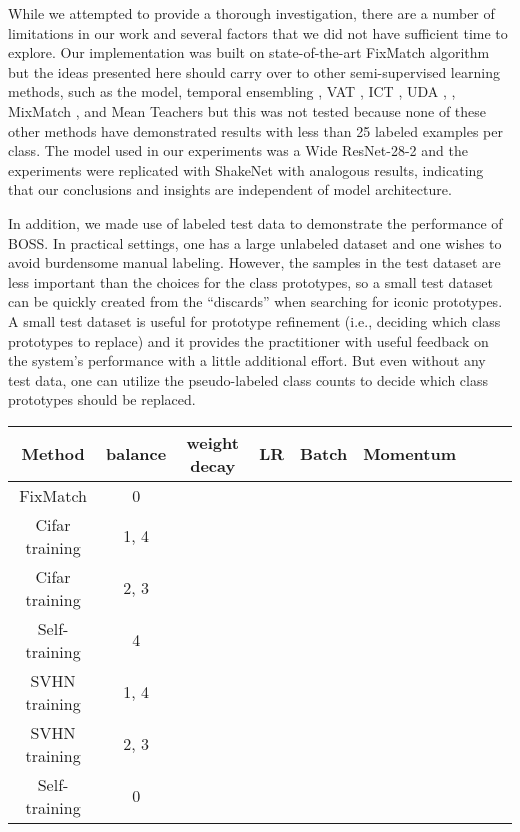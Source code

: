 \documentclass[final]{cvpr}
\newcommand{\SOTA}{state-of-the-art }
\newcommand{\SSL}{semi-supervised learning }
\begin{document}
While we attempted to provide a thorough investigation, there are a number of limitations in our work and several factors that we did not have sufficient time to explore.
Our implementation was built on \SOTA FixMatch algorithm but the ideas presented here should carry over to other \SSL methods, such as the  model, temporal ensembling \cite{laine2016temporal}, VAT \cite{miyato2018virtual}, ICT \cite{verma2019interpolation}, UDA \cite{xie2019unsupervised},  \cite{zhai2019s4l}, MixMatch \cite{berthelot2019mixmatch}, and Mean Teachers \cite{tarvainen2017mean} but this was not tested because none of these other methods  have demonstrated results with less than 25 labeled examples per class.  
The model used in our experiments was a Wide ResNet-28-2 and the experiments were replicated with ShakeNet \cite{gastaldi2017shake} with analogous results, indicating that our conclusions and insights are independent of model architecture.


In addition, we made use of labeled test data to demonstrate the performance of BOSS.
In practical settings, one has a large unlabeled dataset and one wishes to avoid burdensome manual labeling.
However, the samples in the test dataset are less important than the choices for the class prototypes, so a small test dataset can be quickly created from the ``discards'' when searching for iconic prototypes.
A small test dataset is useful for prototype refinement (i.e., deciding which class prototypes to replace) and it provides the practitioner with useful feedback on the system's performance with a little additional effort.
But even without any test data, one can utilize the pseudo-labeled class counts to decide which class prototypes  should be replaced.




\begin{table*}[tb]
	\begin{center}
		\begin{tabular}{|c|c|c|c|c|c|c|c|c|}
			\hline
			Method  & balance & weight decay & LR & Batch & Momentum &  &  &    \\
			\hline\hline
			FixMatch & 0 &   &   &  &  &  &  &    \\
			\hline
			Cifar training & 1, 4 &   &   &  &  &  &  &   \\
			\hline
			Cifar training & 2, 3 &   &   &  &  &  &  &    \\
			\hline
			Self-training & 4 &   &   &  &  &  &  &   \\
			\hline
			SVHN training & 1, 4 &   &   &  &  &  &  &   \\
			\hline
			SVHN training & 2, 3 &   &   &  &  &  &  &   \\
			\hline
			Self-training & 0 &   &   &  &  &  &  &   \\
			\hline
			
		\end{tabular}
	\end{center}
	\caption{Hyper-parameter values for each of the various steps in the training.
	}
	\label{tab:HP}
\end{table*}
\end{document}

